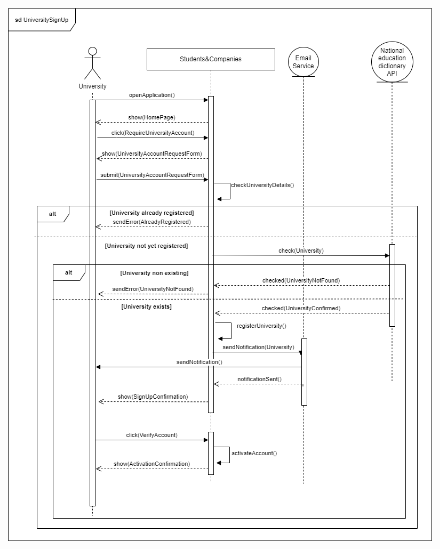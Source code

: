 \documentclass{article}
\begin{document}
\begin{figure}[H]
    \centering
    \includegraphics[scale = 0.45]{figures/UseCasesSD/UniversitySignUp.drawio.png}
\end{figure}
\end{document}
